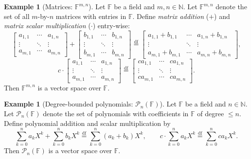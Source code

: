\documentclass[11pt, a4paper, notitlepage]{report}
\theoremstyle{definition}
\newtheorem{example}[theorem]{Example}
\theoremstyle{remark}
\begin{document}
\begin{example}[Matrices: $\mathbb{F}^{m,n}$]\label{ex:Fmn}
Let $\mathbb{F}$ be a field and $m, n \in \mathbb{N}$. Let $\mathbb{F}^{m,n}$ denote the set of all $m$-by-$n$ matrices with entries in $\mathbb{F}$. Define \emph{matrix addition} ($+$) and \emph{matrix scalar multiplication} ($\cdot$) entry-wise:
\[
  \begin{bmatrix} a_{1,1} & \cdots & a_{1,n} \\ \vdots & \ddots & \vdots \\ a_{m,1} & \cdots & a_{m,n} \end{bmatrix}
  +
  \begin{bmatrix} b_{1,1} & \cdots & b_{1,n} \\ \vdots & \ddots & \vdots \\ b_{m,1} & \cdots & b_{m,n} \end{bmatrix}
  \stackrel{\mathrm{df}}{=}
  \begin{bmatrix} a_{1,1}+b_{1,1} & \cdots & a_{1,n}+b_{1,n} \\ \vdots & \ddots & \vdots \\ a_{m,1}+b_{m,1} & \cdots & a_{m,n}+b_{m,n} \end{bmatrix},
\]
\[
  c \cdot \begin{bmatrix} a_{1,1} & \cdots & a_{1,n} \\ \vdots & \ddots & \vdots \\ a_{m,1} & \cdots & a_{m,n} \end{bmatrix}
  \stackrel{\mathrm{df}}{=}
  \begin{bmatrix} ca_{1,1} & \cdots & ca_{1,n} \\ \vdots & \ddots & \vdots \\ ca_{m,1} & \cdots & ca_{m,n} \end{bmatrix}.
\]
Then $\mathbb{F}^{m,n}$ is a vector space over $\mathbb{F}$.
\end{example}

\begin{example}[Degree-bounded polynomials: $\mathscr{P}_n(\mathbb{F})$]\label{ex:Pn}
Let $\mathbb{F}$ be a field and $n \in \mathbb{N}$. Let $\mathscr{P}_n(\mathbb{F})$ denote the set of polynomials with coefficients in $\mathbb{F}$ of degree $\leq n$. Define polynomial addition and scalar multiplication by
\[
  \sum_{k=0}^n a_k X^k + \sum_{k=0}^n b_k X^k \stackrel{\mathrm{df}}{=} \sum_{k=0}^n (a_k + b_k) X^k, \qquad c \cdot \sum_{k=0}^n a_k X^k \stackrel{\mathrm{df}}{=} \sum_{k=0}^n ca_k X^k.
\]
Then $\mathscr{P}_n(\mathbb{F})$ is a vector space over $\mathbb{F}$.
\end{example}
\end{document}
